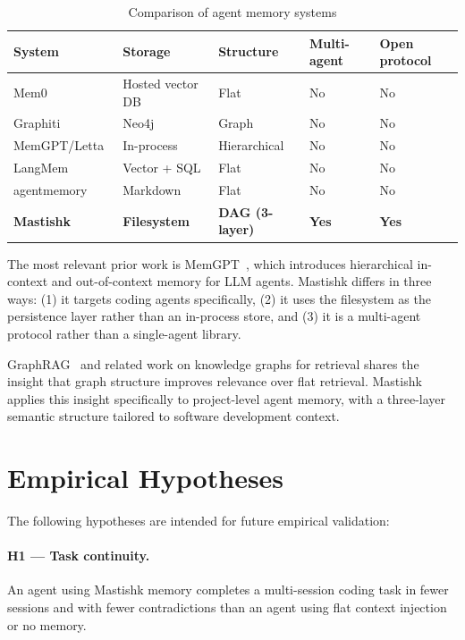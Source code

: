 \documentclass[11pt]{article}
\begin{document}
\begin{table}[H]
\centering
\begin{tabular}{lllll}
\toprule
System & Storage & Structure & Multi-agent & Open protocol \\
\midrule
Mem0~\cite{mem0} & Hosted vector DB & Flat & No & No \\
Graphiti~\cite{graphiti} & Neo4j & Graph & No & No \\
MemGPT/Letta~\cite{packer2023memgpt} & In-process & Hierarchical & No & No \\
LangMem & Vector + SQL & Flat & No & No \\
agentmemory & Markdown & Flat & No & No \\
\textbf{Mastishk} & \textbf{Filesystem} & \textbf{DAG (3-layer)} & \textbf{Yes} & \textbf{Yes} \\
\bottomrule
\end{tabular}
\caption{Comparison of agent memory systems}
\end{table}

The most relevant prior work is MemGPT~\cite{packer2023memgpt}, which introduces hierarchical in-context and out-of-context memory for LLM agents. Mastishk differs in three ways: (1) it targets coding agents specifically, (2) it uses the filesystem as the persistence layer rather than an in-process store, and (3) it is a multi-agent protocol rather than a single-agent library.

GraphRAG~\cite{edge2024local} and related work on knowledge graphs for retrieval shares the insight that graph structure improves relevance over flat retrieval. Mastishk applies this insight specifically to project-level agent memory, with a three-layer semantic structure tailored to software development context.

\section{Empirical Hypotheses}
\label{sec:hypotheses}

The following hypotheses are intended for future empirical validation:

\paragraph{H1 --- Task continuity.}
An agent using Mastishk memory completes a multi-session coding task in fewer sessions and with fewer contradictions than an agent using flat context injection or no memory.
\end{document}
